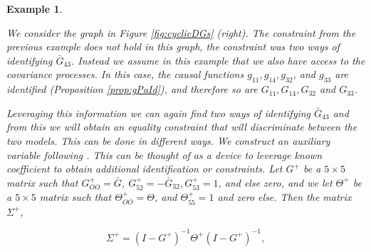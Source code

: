 \documentclass[accepted]{uai2021} %
\newtheorem{exmp}[thm]{Example}
\begin{document}
\begin{exmp}
\begin{figure*}
\begin{subfigure}{0.48\linewidth}
		\end{subfigure}
		\caption{\label{fig:cyclicDGs} Loops (self-edges) are omitted from this 
		vizualiation. Circles represent observed coordinate processes and 
		squares represent unobserved processes. Left: . Right: }
	\end{figure*}
	
	We consider the graph in Figure \ref{fig:cyclicDGs} (right). The constraint 
	from the previous example does not hold in this graph, the constraint was 
	two ways of identifying $\bar{G}_{43}$. Instead we assume in 
	this example that we also have access to the 
	covariance processes. In this case, the causal functions 
	$g_{11},g_{14},g_{32}$, and $g_{33}$ are identified (Proposition 
	\ref{prop:gPaId}), and therefore so are $G_{11}, G_{14} , G_{32}$ and 
	$G_{33}$.
	
	Leveraging this information we can again find two ways of identifying 
	$\bar{G}_{43}$ and from this we will obtain an equality constraint that 
	will 
	discriminate between the two models. This can be done in different ways. We 
	construct an {\it auxiliary 
	variable} following \cite{chenIJCAI2016, chenICML2017}. This can be thought 
	of as a device to leverage known coefficient to obtain additional 
	identification or constraints. Let $G^+$ be a 
	$5\times 5$ 
	matrix such that $G_{OO}^+ = \bar{G}$, $G_{52}^+ = -\bar{G}_{32}, G_{53}^+ 
	= 1$, and else zero, and we let $\Theta^+$ be a $5\times 5$ matrix such 
	that $\Theta_{OO}^+ = \Theta$, and $\Theta_{55}^+ = 1$ and zero else. Then 
	the matrix $\Sigma^+$,
	
	$$
	\Sigma^+ = (I - G^+)^{-1}\Theta^+(I-G^+)^{-1},
	$$
	

\end{exmp}
\end{document}
